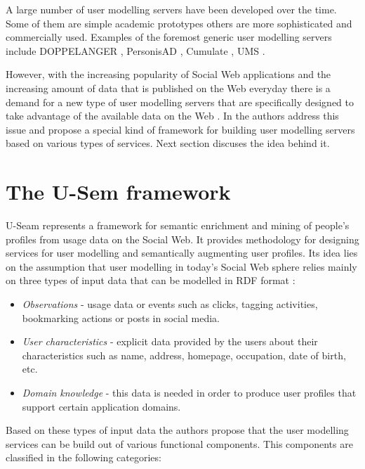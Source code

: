 A large number of user modelling servers have been developed over the time. Some of them are simple academic prototypes others are more sophisticated and commercially used. Examples of the foremost generic user modelling servers include DOPPELANGER \cite{orwant1994heterogeneous}, PersonisAD \cite{assad2007personisad}, Cumulate \cite{brusilovsky2004knowledgetree}, UMS \cite{kobsa2006ldap}.

However, with the increasing popularity of Social Web applications and the increasing amount of data that is published on the Web everyday there is a demand for a new type of user modelling servers that are specifically designed to take advantage of the available data on the Web \cite{brusilovsky2007adaptive}. In \cite{abel2011u} the authors address this issue and propose a special kind of framework for building user modelling servers based on various types of services. Next section discuses the idea behind it.

\section{The U-Sem framework}
\label{sec:usemFrm}

U-Seam represents a framework for semantic enrichment and mining of people's profiles from usage data on the Social Web. It provides methodology for designing services for user modelling and semantically augmenting user profiles. Its idea lies on the assumption that user modelling in today's Social Web sphere relies mainly on three types of input data \cite{abel2011u} that can be modelled in RDF format \cite{miller1998introduction}:

\begin{itemize}
	\item \textit{Observations} - usage data or events such as clicks, tagging activities, bookmarking actions or posts in social media.
	
	\item \textit{User characteristics} - explicit data provided by the users about their characteristics such as name, address, homepage, occupation, date of birth, etc.
	
	\item \textit{Domain knowledge} - this data is needed in order to produce user profiles that support certain application domains.
\end{itemize}

Based on these types of input data the authors propose that the user modelling services can be build out of various functional components. This components are classified in the following categories:

